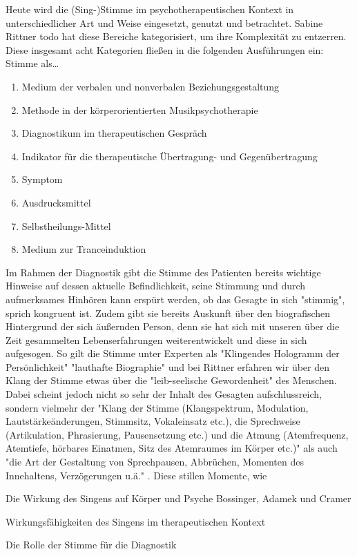 Heute wird die (Sing-)Stimme im psychotherapeutischen Kontext in unterschiedlicher Art und Weise eingesetzt, genutzt und betrachtet. Sabine Rittner todo hat diese Bereiche kategorisiert, um ihre Komplexität zu entzerren. Diese insgesamt acht Kategorien fließen in die folgenden Ausführungen ein: 
Stimme als\ldots
\begin{enumerate}
\item Medium der verbalen und nonverbalen Beziehungsgestaltung
\item Methode in der körperorientierten Musikpsychotherapie
\item Diagnostikum im therapeutischen Gespräch
\item Indikator für die therapeutische Übertragung- und Gegenübertragung
\item Symptom
\item Ausdrucksmittel
\item Selbstheilungs-Mittel
\item Medium zur Tranceinduktion
\end{enumerate}
Im Rahmen der Diagnostik gibt die Stimme des Patienten bereits wichtige Hinweise auf dessen aktuelle Befindlichkeit, seine Stimmung und durch aufmerksames Hinhören kann erspürt werden, ob das Gesagte in sich "stimmig", sprich kongruent ist. Zudem gibt sie bereits Auskunft über den biografischen Hintergrund der sich äußernden Person, denn sie hat sich mit unseren über die Zeit gesammelten Lebenserfahrungen weiterentwickelt und diese in sich aufgesogen. So gilt die Stimme unter Experten als "Klingendes Hologramm der Persönlichkeit" \autocite{adamek1999} "lauthafte Biographie" \autocite{gundermann1994} und bei Rittner erfahren wir über den Klang der Stimme etwas über die "leib-seelische Gewordenheit" \autocite[211]{rittner2008} des Menschen.
Dabei scheint jedoch nicht so sehr der Inhalt des Gesagten aufschlussreich, sondern vielmehr der "Klang der Stimme (Klangspektrum, Modulation, Lautstärkeänderungen, Stimmsitz, Vokaleinsatz etc.), die Sprechweise (Artikulation, Phrasierung, Pausensetzung etc.) und die Atmung (Atemfrequenz, Atemtiefe, hörbares Einatmen, Sitz des Atemraumes im Körper etc.)" als auch "die Art der Gestaltung von Sprechpausen, Abbrüchen, Momenten des Innehaltens, Verzögerungen u.ä." \autocite[210]{rittner2008}. Diese stillen Momente, wie


Die Wirkung des Singens auf Körper und Psyche
Bossinger, Adamek und Cramer

Wirkungsfähigkeiten des Singens im therapeutischen Kontext

Die Rolle der Stimme für die Diagnostik




\newpage\thispagestyle{empty}
